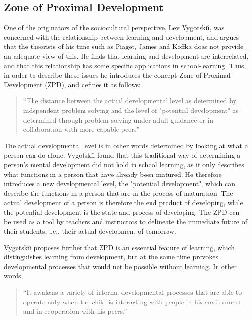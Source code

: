 \subsection{Zone of Proximal Development}
One of the originators of the sociocultural perspective, Lev Vygotski{\u\i}, was concerned with the relationship between learning and development, and argues that the theorists of his time such as Piaget, James and Koffka does not provide an adequate view of this. He finds that learning and development are interrelated, and that this relationship has some specific applications in school-learning. \citep[p. 84]{vygotskiui1978mind} Thus, in order to describe these issues he introduces the concept Zone of Proximal Development (ZPD), and defines it as follows:

\begin{quote}“The distance between the actual developmental level as determined by independent problem solving and the level of "potential development" as determined through problem solving under adult guidance or in collaboration with more capable peers” \citep[p. 86]{vygotskiui1978mind}
\end{quote}

The actual developmental level is in other words determined by looking at what a person can do alone. Vygotski{\u\i} found that this traditional way of determining a person's mental development did not hold in school learning, as it only describes what functions in a person that have already been matured. He therefore introduces a new developmental level, the "potential development", which can describe the functions in a person that are in the process of maturation. The actual development of a person is therefore the end product of developing, while the potential development is the state and process of developing. The ZPD can be used as a tool by teachers and instructors to delineate the immediate future of their students, i.e., their actual development of tomorrow.

Vygotski{\u\i} proposes further that ZPD is an essential feature of learning, which distinguishes learning from development, but at the same time provokes developmental processes that would not be possible without learning. In other words,

\begin{quote}“It awakens a variety of internal developmental processes that are able to operate only when the child is interacting with people  in  his  environment  and  in  cooperation  with his peers.” \citep[p. 90]{vygotskiui1978mind}
\end{quote}


